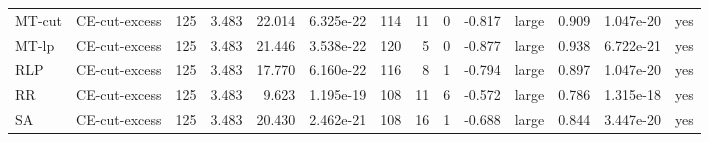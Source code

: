 \begin{table}[htbp]
\begin{tabular}{llrrrrrrrrlrrr}
MT-cut & CE-cut-excess & 125 & 3.483 & 22.014 & 6.325e-22 & 114 & 11 & 0 & -0.817 & large & 0.909 & 1.047e-20 & yes \\
MT-lp & CE-cut-excess & 125 & 3.483 & 21.446 & 3.538e-22 & 120 & 5 & 0 & -0.877 & large & 0.938 & 6.722e-21 & yes \\
RLP & CE-cut-excess & 125 & 3.483 & 17.770 & 6.160e-22 & 116 & 8 & 1 & -0.794 & large & 0.897 & 1.047e-20 & yes \\
RR & CE-cut-excess & 125 & 3.483 & 9.623 & 1.195e-19 & 108 & 11 & 6 & -0.572 & large & 0.786 & 1.315e-18 & yes \\
SA & CE-cut-excess & 125 & 3.483 & 20.430 & 2.462e-21 & 108 & 16 & 1 & -0.688 & large & 0.844 & 3.447e-20 & yes \\
\bottomrule
\end{tabular}
\end{table}
